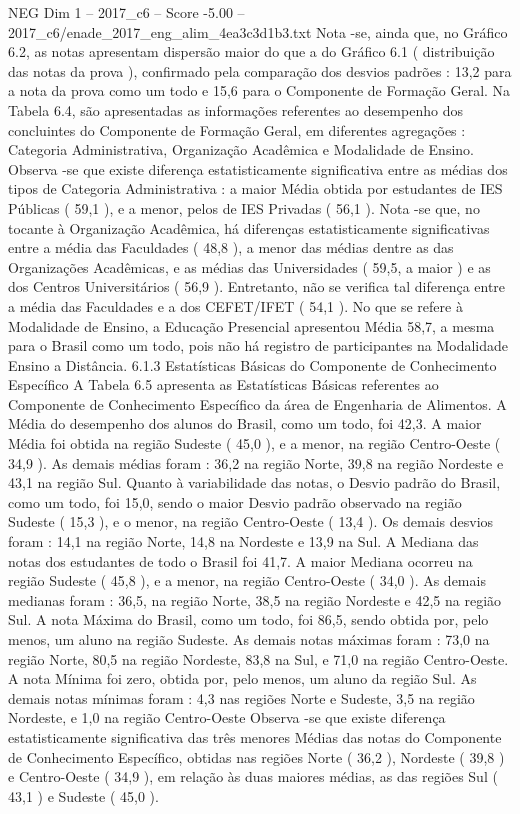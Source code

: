 \begin{textsample}{NEG Dim 1 – 2017\_c6 – Score -5.00 – 2017\_c6/enade\_2017\_eng\_alim\_4ea3c3d1b3.txt}
Nota -se, ainda que, no Gráfico 6.2, as notas apresentam dispersão maior do que a do Gráfico 6.1 ( distribuição das notas da prova ), confirmado pela comparação dos desvios padrões : 13,2 para a nota da prova como um todo e 15,6 para o Componente de Formação Geral.
Na Tabela 6.4, são apresentadas as informações referentes ao desempenho dos concluintes do Componente de Formação Geral, em diferentes agregações : Categoria Administrativa, Organização Acadêmica e Modalidade de Ensino.
Observa -se que existe diferença estatisticamente significativa entre as médias dos tipos de Categoria Administrativa : a maior Média obtida por estudantes de IES Públicas ( 59,1 ), e a menor, pelos de IES Privadas ( 56,1 ).
Nota -se que, no tocante à Organização Acadêmica, há diferenças estatisticamente significativas entre a média das Faculdades ( 48,8 ), a menor das médias dentre as das Organizações Acadêmicas, e as médias das Universidades ( 59,5, a maior ) e as dos Centros Universitários ( 56,9 ).
Entretanto, não se verifica tal diferença entre a média das Faculdades e a dos CEFET/IFET ( 54,1 ).
No que se refere à Modalidade de Ensino, a Educação Presencial apresentou Média 58,7, a mesma para o Brasil como um todo, pois não há registro de participantes na Modalidade Ensino a Distância. 6.1.3 Estatísticas Básicas do Componente de Conhecimento Específico A Tabela 6.5 apresenta as Estatísticas Básicas referentes ao Componente de Conhecimento Específico da área de Engenharia de Alimentos.
A Média do desempenho dos alunos do Brasil, como um todo, foi 42,3.
A maior Média foi obtida na região Sudeste ( 45,0 ), e a menor, na região Centro-Oeste ( 34,9 ).
As demais médias foram : 36,2 na região Norte, 39,8 na região Nordeste e 43,1 na região Sul.
Quanto à variabilidade das notas, o Desvio padrão do Brasil, como um todo, foi 15,0, sendo o maior Desvio padrão observado na região Sudeste ( 15,3 ), e o menor, na região Centro-Oeste ( 13,4 ).
Os demais desvios foram : 14,1 na região Norte, 14,8 na Nordeste e 13,9 na Sul.
A Mediana das notas dos estudantes de todo o Brasil foi 41,7.
A maior Mediana ocorreu na região Sudeste ( 45,8 ), e a menor, na região Centro-Oeste ( 34,0 ).
As demais medianas foram : 36,5, na região Norte, 38,5 na região Nordeste e 42,5 na região Sul.
A nota Máxima do Brasil, como um todo, foi 86,5, sendo obtida por, pelo menos, um aluno na região Sudeste.
As demais notas máximas foram : 73,0 na região Norte, 80,5 na região Nordeste, 83,8 na Sul, e 71,0 na região Centro-Oeste.
A nota Mínima foi zero, obtida por, pelo menos, um aluno da região Sul.
As demais notas mínimas foram : 4,3 nas regiões Norte e Sudeste, 3,5 na região Nordeste, e 1,0 na região Centro-Oeste Observa -se que existe diferença estatisticamente significativa das três menores Médias das notas do Componente de Conhecimento Específico, obtidas nas regiões Norte ( 36,2 ), Nordeste ( 39,8 ) e Centro-Oeste ( 34,9 ), em relação às duas maiores médias, as das regiões Sul ( 43,1 ) e Sudeste ( 45,0 ).

\end{textsample}

